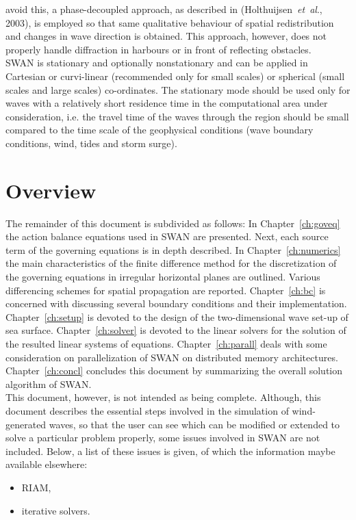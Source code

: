 \documentclass[12pt]{book}
\begin{document}
avoid this, a phase-decoupled approach, as described in (Holthuijsen~{\it et~al}., 2003),
is employed so that same qualitative behaviour of spatial redistribution and changes in wave direction is
obtained. This approach, however, does not properly handle diffraction in harbours
or in front of reflecting obstacles.
\nocite{Hol03HB}
\\[2ex]
\noindent
SWAN is stationary and optionally nonstationary and can be applied in Cartesian or curvi-linear
(recommended only for small scales) or spherical (small scales and large scales) co-ordinates. The
stationary mode should be used only for waves with a relatively short residence time in the computational
area under consideration, i.e. the travel time of the waves through the region should be small compared
to the time scale of the geophysical conditions (wave boundary conditions, wind, tides and storm surge).

\section{Overview} \label{sec:overv}

The remainder of this document is subdivided as follows: In Chapter~\ref{ch:goveq} the action balance equations
used in SWAN are presented. Next, each source term of the governing equations is in depth described.
In Chapter~\ref{ch:numerics} the main characteristics of the finite difference method for the discretization
of the governing equations in irregular horizontal planes are outlined. Various differencing schemes for spatial
propagation are reported. Chapter~\ref{ch:bc} is concerned with discussing several boundary conditions and their
implementation.
Chapter~\ref{ch:setup} is devoted to the design of the two-dimensional wave set-up of sea surface.
Chapter~\ref{ch:solver} is devoted to the linear solvers for the solution of the resulted linear
systems of equations.
Chapter~\ref{ch:parall} deals with some consideration on parallelization of SWAN on
distributed memory architectures.
Chapter~\ref{ch:concl} concludes this document by summarizing the overall solution algorithm of SWAN.
\\[2ex]
\noindent
This document, however, is not intended as being complete. Although, this document describes the essential steps
involved in the simulation of wind-generated waves, so that the user can see which can be modified or extended to solve
a particular problem properly, some issues involved in SWAN are not included. Below, a list of these issues is
given, of which the information maybe available elsewhere:
\begin{itemize}
  \item RIAM,
  \item iterative solvers.
\end{itemize}
\end{document}
